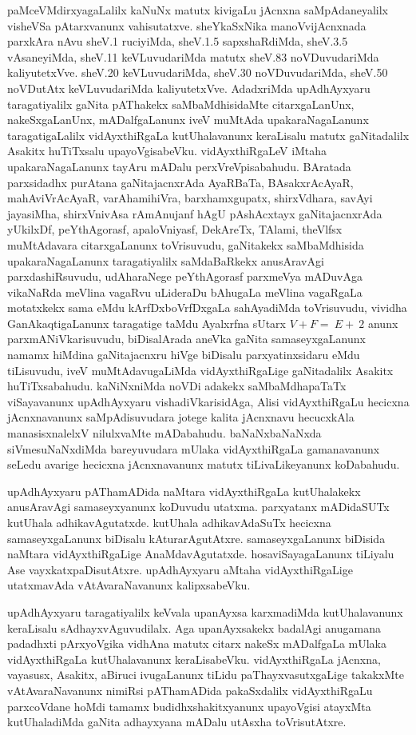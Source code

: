 paMceVMdirxyagaLalilx kaNuNx matutx kivigaLu jAcnxna saMpAdaneyalilx visheVSa \-pAtarxvanunx vahisutatxve. sheYkaSxNika manoVvijAcnxnada parxkAra nAvu sheV.{\rm 1} ruciyiMda, sheV.{\rm 1.5} sapxshaR\-diMda, sheV.{\rm 3.5} vAsaneyiMda, sheV.{\rm 11} keVLuvudariMda matutx sheV.{\rm 83} noVDuvudariMda kaliyutetxVve. sheV.{\rm 20} keVLuvudariMda, sheV.{\rm 30} noVDuvudariMda, sheV.{\rm 50} noVDutAtx keVLuvudariMda kaliyutetxVve. AdadxriMda upAdhAyxyaru taragatiyalilx gaNita pAThakekx saMbaMdhisidaMte citarxgaLanUnx, nakeSxgaLanUnx, mADalfgaLanunx iveV muMtAda upakaraNagaLanunx taragatigaLalilx vidAyxthiRgaLa kutUhalavanunx keraLisalu matutx gaNitadalilx Asakitx huTiTxsalu upayoVgisabeVku. vidAyxthiRgaLeV iMtaha upa\-karaNagaLanunx tayAru mADalu perxVreVpisabahudu. BAratada parxsidadhx purAtana gaNitajacnxrAda AyaRBaTa, BAsakxrAcAyaR, mahAviVrAcAyaR, varAhamihiVra, barxhamxgupatx, shirxVdhara, savAyi jayasiMha, shirxVnivAsa rAmAnujanf hAgU pAshAcxtayx gaNitajacnxrAda yUkilxDf, peYthAgorasf, apaloVniyasf, DekAreTx, TAlami, theVlfsx muMtAdavara citarxgaLanunx toVrisuvudu, gaNitakekx saMbaMdhisida upakaraNagaLanunx taragatiyalilx saMdaBaRkekx anusAravAgi parxdashiRsuvudu, udAharaNege peYthAgorasf parxmeVya mADuvAga vikaNaRda meVlina vagaRvu uLideraDu bAhugaLa meVlina vagaRgaLa motatxkekx sama eMdu kArfDxboVrfDxgaLa sahAyadiMda toVrisuvudu, vividha GanAkaqtigaLanunx taragatige taMdu Ayalxrfna sUtarx $V+F=~E+~2$ anunx parxmANiVkarisuvudu, biDisalArada aneVka gaNita samaseyxgaLanunx namamx hiMdina gaNitajacnxru hiVge biDisalu parxyatinxsidaru eMdu tiLisuvudu, iveV muMtAdavugaLiMda vidAyxthiRgaLige gaNitadalilx Asakitx huTiTxsabahudu. kaNiNxniMda noVDi adakekx saMbaMdha\-paTaTx viSayavanunx upAdhAyxyaru vishadiVkarisidAga, Alisi vidAyxthiRgaLu hecicxna jAcnxnavanunx saMpAdisuvudara jotege kalita jAcnxnavu hecucxkAla manasisxnalelxV nilulxvaMte mADabahudu. baNaNxbaNaNxda siVmesuNaNxdiMda bareyuvudara mUlaka vidAyxthiRgaLa gamanavanunx seLedu avarige hecicxna jAcnxnavanunx matutx tiLivaLikeyanunx koDabahudu.

upAdhAyxyaru pAThamADida naMtara vidAyxthiRgaLa kutUhalakekx anusAravAgi samaseyxyanunx koDuvudu utatxma. parxyatanx mADidaSUTx kutUhala adhikavAgutatxde. kutUhala adhikavAdaSuTx hecicxna samaseyxgaLanunx biDisalu kAturarAgutAtxre. samaseyx\-gaLanunx biDisida naMtara vidAyxthiRgaLige AnaMdavAgutatxde. hosaviSayagaLanunx tiLiyalu Ase vayxkatxpaDisutAtxre. upAdhAyxyaru aMtaha vidAyxthiRgaLige utatxmavAda vAtAvaraNavanunx kalipxsabeVku.

upAdhAyxyaru taragatiyalilx keVvala upanAyxsa karxmadiMda kutUhalavanunx keraLi\-salu sAdhayxvAguvudilalx. Aga upanAyxsakekx badalAgi anugamana padadhxti pArxyoVgika vidhAna matutx citarx nakeSx mADalfgaLa mUlaka vidAyxthiRgaLa kutUhalavanunx keraLisabeVku. vidAyxthiRgaLa jAcnxna, vayasusx, Asakitx, aBiruci ivugaLanunx tiLidu paThayxvasutxgaLige takakxMte vAtAvaraNavanunx nimiRsi pAThamADida pakaSxdalilx vidAyxthiRgaLu parxcoVdane hoMdi tamamx budidhxshakitxyanunx upayoVgisi atayxMta kutUhaladiMda gaNita adhayxyana mADalu utAsxha toVrisutAtxre.


